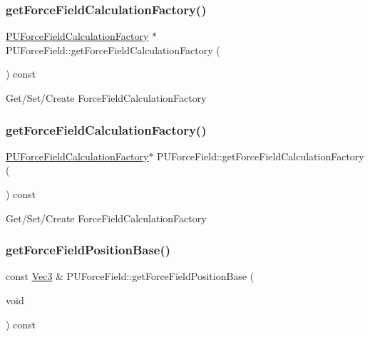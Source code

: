 \subsubsection{\texorpdfstring{get\+Force\+Field\+Calculation\+Factory()}{getForceFieldCalculationFactory()}\hspace{0.1cm}{\footnotesize\ttfamily [1/2]}}
{\footnotesize\ttfamily \hyperlink{classPUForceFieldCalculationFactory}{P\+U\+Force\+Field\+Calculation\+Factory} $\ast$ P\+U\+Force\+Field\+::get\+Force\+Field\+Calculation\+Factory (\begin{DoxyParamCaption}{ }\end{DoxyParamCaption}) const\hspace{0.3cm}{\ttfamily [protected]}}

Get/\+Set/\+Create Force\+Field\+Calculation\+Factory \mbox{\label{classPUForceField_a8c68ee8a2599b197f50dbfcaf887e7c2}} 
\subsubsection{\texorpdfstring{get\+Force\+Field\+Calculation\+Factory()}{getForceFieldCalculationFactory()}\hspace{0.1cm}{\footnotesize\ttfamily [2/2]}}
{\footnotesize\ttfamily \hyperlink{classPUForceFieldCalculationFactory}{P\+U\+Force\+Field\+Calculation\+Factory}$\ast$ P\+U\+Force\+Field\+::get\+Force\+Field\+Calculation\+Factory (\begin{DoxyParamCaption}{ }\end{DoxyParamCaption}) const\hspace{0.3cm}{\ttfamily [protected]}}

Get/\+Set/\+Create Force\+Field\+Calculation\+Factory \mbox{\label{classPUForceField_a1af8837a7ef5227d5d163ae8f145b0c3}} 
\subsubsection{\texorpdfstring{get\+Force\+Field\+Position\+Base()}{getForceFieldPositionBase()}\hspace{0.1cm}{\footnotesize\ttfamily [1/2]}}
{\footnotesize\ttfamily const \hyperlink{classVec3}{Vec3} \& P\+U\+Force\+Field\+::get\+Force\+Field\+Position\+Base (\begin{DoxyParamCaption}\item[{void}]{ }\end{DoxyParamCaption}) const}

